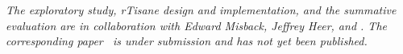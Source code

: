 




\textit{The exploratory study, rTisane design and implementation, and the
summative evaluation are in collaboration with Edward Misback, Jeffrey Heer, and
\reneJust. The corresponding paper~\cite{jun2023rTisane} is under submission and has not yet been
published.}

